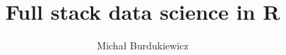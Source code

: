 \usepackage[utf8]{inputenc}
\usepackage{polski}
\usepackage{amsfonts}
\usepackage{amsmath}
\usepackage{natbib}
\usepackage{graphicx}
\usepackage{array,booktabs,tabularx}
\usepackage{epstopdf}
\usepackage{colortbl, xcolor}
\usepackage{url}
\usepackage{svg}

\title{Full stack data science in R}
\date{}
\author{Michał Burdukiewicz}

